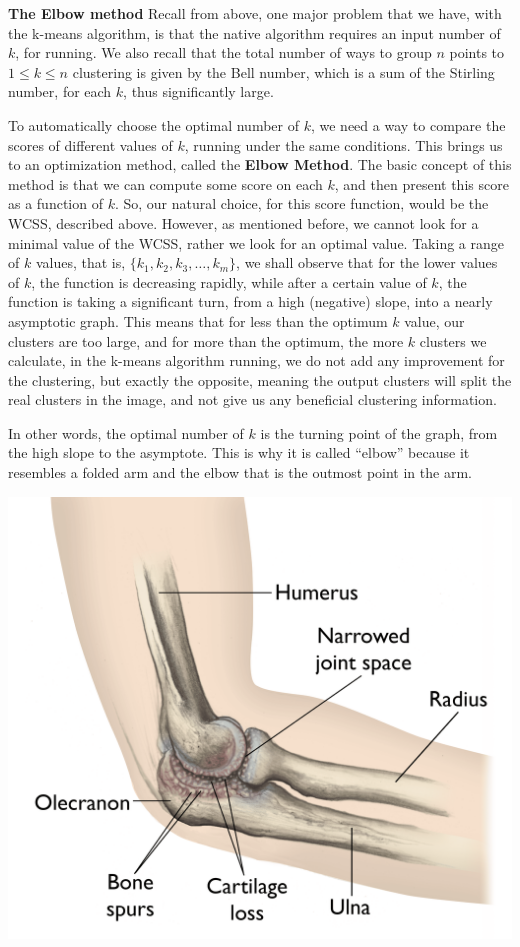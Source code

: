 \documentclass[12pt]{article}
\begin{document}
\textbf{The Elbow method} \newline
Recall from above, one major problem that we have, with the k-means algorithm, is that the native algorithm requires an input number of $k$, for running. We also recall that the total number of ways to group \( n \) points to \( 1 \leq k \leq n \) clustering is given by the Bell number, which is a sum of the Stirling number, for each $k$, thus significantly large. \newline

To automatically choose the optimal number of $k$, we need a way to compare the scores of different values of $k$, running under the same conditions. This brings us to an optimization method, called the \textbf{Elbow Method}. The basic concept of this method is that we can compute some score on each $k$, and then present this score as a function of $k$. \newline
So, our natural choice, for this score function, would be the WCSS, described above. \newline 
However, as mentioned before, we cannot look for a minimal value of the WCSS, rather we look for an optimal value.
Taking a range of $k$ values, that is, \( \{k_1,k_2,k_3,…,k_m \} \), we shall observe that for the lower values of $k$, the function is decreasing rapidly, while after a certain value of $k$, the function is taking a significant turn, from a high (negative) slope, into a nearly asymptotic graph. 
This means that for less than the optimum $k$ value, our clusters are too large, and for more than the optimum, the more $k$ clusters we calculate, in the k-means algorithm running, we do not add any improvement for the clustering, but exactly the opposite, meaning the output clusters will split the real clusters in the image, and not give us any beneficial clustering information. \newline

In other words, the optimal number of $k$ is the turning point of the graph, from the high slope to the asymptote. This is why it is called “elbow” because it resembles a folded arm and the elbow that is the outmost point in the arm. \newline

\includegraphics[width=0.38\columnwidth]{elbow-oa---final.png} \newline
\end{document}
